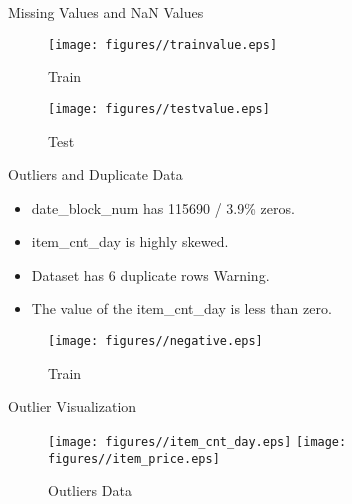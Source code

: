 \documentclass[
size=14pt,
paper=smartboard,  %
mode=present, 		%
display=slides, 	%
style=tuliplab,  	%
pauseslide,
fleqn,leqno]{powerdot}
\begin{document}
	
	
	\begin{slide}{Missing Values and NaN Values}
		
		\begin{figure}
			\centering
			\texttt{[image: figures//trainvalue.eps]}
			\caption{Train}\label{fig:demical}
		\end{figure}
		
		\begin{figure}
			\centering
			\texttt{[image: figures//testvalue.eps]}
			\caption{Test}\label{fig:timg}
		\end{figure}
		
	\end{slide}
	
	
	\begin{slide}{Outliers and Duplicate Data}
		
		\begin{itemize}
			\item
			date\_block\_num has 115690 / 3.9\% zeros.
			\item
			item\_cnt\_day is highly skewed.
			\item
			Dataset has 6 duplicate rows Warning.
			\item
			The value of the item\_cnt\_day is less than zero.
		\end{itemize}
		\begin{figure}
			\centering
			\texttt{[image: figures//negative.eps]}
			\caption{Train}\label{fig:timg}
		\end{figure}
		
	\end{slide}
	
	
	\begin{slide}[toc=,bm=]{Outlier Visualization}
		\begin{figure}
			\centering
			\texttt{[image: figures//item\_cnt\_day.eps]}
			\texttt{[image: figures//item\_price.eps]}
			\caption{Outliers Data}\label{fig:timg}
		\end{figure}
	\end{slide}
	
\end{document}
